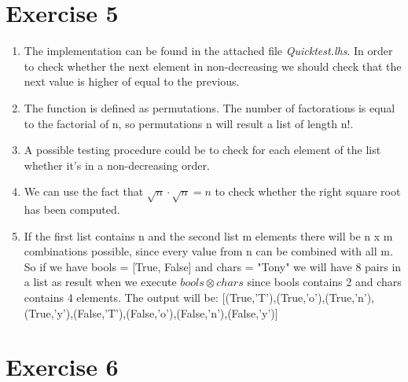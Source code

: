 \documentclass{article}
\begin{document}
\section*{Exercise 5}
\begin{enumerate}
  \item The implementation can be found in the attached file \emph{Quicktest.lhs}. In order to check whether the next element in non-decreasing we should check that the next value is higher of equal to the previous.
  \item The function is defined as permutations. The number of factorations is equal to the factorial of n, so permutations n will result a list of length n!.
  \item A possible testing procedure could be to check for each element of the list whether it's in a non-decreasing order.
  \item We can use the fact that $\sqrt{n} \cdot \sqrt{n} = n$ to check whether the right square root has been computed.
  \item If the first list contains n and the second list m elements there will be n x m combinations possible, since every value from n can be combined with all m. So if we have bools = [True, False] and chars = "Tony" we will have 8 pairs in a list as result when we execute $bools \otimes chars$ since bools contains 2 and chars contains 4 elements. The output will be:  [(True,'T'),(True,'o'),(True,'n'),(True,'y'),(False,'T'),(False,'o'),(False,'n'),(False,'y')]
\end{enumerate}

\section*{Exercise 6}
\end{document}
